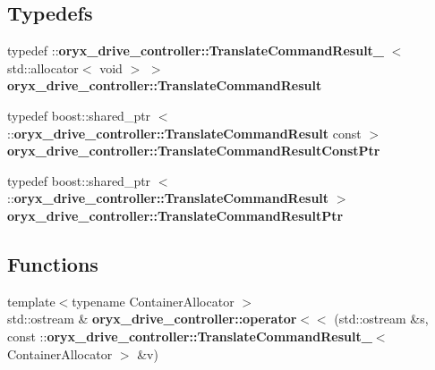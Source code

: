 \subsection*{\-Typedefs}
\begin{DoxyCompactItemize}
\item 
typedef \*
\-::{\bf oryx\-\_\-drive\-\_\-controller\-::\-Translate\-Command\-Result\-\_\-}\*
$<$ std\-::allocator$<$ void $>$ $>$ {\bf oryx\-\_\-drive\-\_\-controller\-::\-Translate\-Command\-Result}
\item 
typedef boost\-::shared\-\_\-ptr\*
$<$ \-::{\bf oryx\-\_\-drive\-\_\-controller\-::\-Translate\-Command\-Result} \*
const  $>$ {\bf oryx\-\_\-drive\-\_\-controller\-::\-Translate\-Command\-Result\-Const\-Ptr}
\item 
typedef boost\-::shared\-\_\-ptr\*
$<$ \-::{\bf oryx\-\_\-drive\-\_\-controller\-::\-Translate\-Command\-Result} $>$ {\bf oryx\-\_\-drive\-\_\-controller\-::\-Translate\-Command\-Result\-Ptr}
\end{DoxyCompactItemize}
\subsection*{\-Functions}
\begin{DoxyCompactItemize}
\item 
{\footnotesize template$<$typename Container\-Allocator $>$ }\\std\-::ostream \& {\bf oryx\-\_\-drive\-\_\-controller\-::operator$<$$<$} (std\-::ostream \&s, const \-::{\bf oryx\-\_\-drive\-\_\-controller\-::\-Translate\-Command\-Result\-\_\-}$<$ \-Container\-Allocator $>$ \&v)
\end{DoxyCompactItemize}

